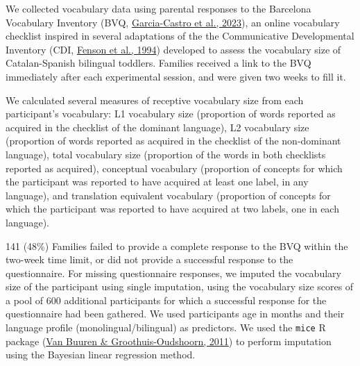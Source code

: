 \documentclass[
  letterpaper,
  DIV=11,
  numbers=noendperiod]{scrartcl}
\begin{document}
We collected vocabulary data using parental responses to the Barcelona
Vocabulary Inventory (BVQ,
\protect\hyperlink{ref-garcia-castro2023bvq}{Garcia-Castro et al.,
2023}), an online vocabulary checklist inspired in several adaptations
of the the Communicative Developmental Inventory (CDI,
\protect\hyperlink{ref-fenson1994variability}{Fenson et al., 1994})
developed to assess the vocabulary size of Catalan-Spanish bilingual
toddlers. Families received a link to the BVQ immediately after each
experimental session, and were given two weeks to fill it.

We calculated several measures of receptive vocabulary size from each
participant's vocabulary: L1 vocabulary size (proportion of words
reported as acquired in the checklist of the dominant language), L2
vocabulary size (proportion of words reported as acquired in the
checklist of the non-dominant language), total vocabulary size
(proportion of the words in both checklists reported as acquired),
conceptual vocabulary (proportion of concepts for which the participant
was reported to have acquired at least one label, in any language), and
translation equivalent vocabulary (proportion of concepts for which the
participant was reported to have acquired at two labels, one in each
language).

141 (48\%) Families failed to provide a complete response to the BVQ
within the two-week time limit, or did not provide a successful response
to the questionnaire. For missing questionnaire responses, we imputed
the vocabulary size of the participant using single imputation, using
the vocabulary size scores of a pool of 600 additional participants for
which a successful response for the questionnaire had been gathered. We
used participants age in months and their language profile
(monolingual/bilingual) as predictors. We used the \texttt{mice} R
package (\protect\hyperlink{ref-van2011mice}{Van Buuren \&
Groothuis-Oudshoorn, 2011}) to perform imputation using the Bayesian
linear regression method.
\end{document}
